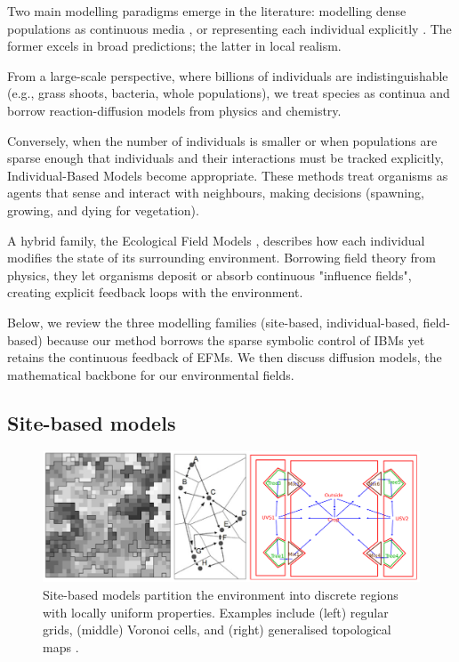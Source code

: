 
Two main modelling paradigms emerge in the literature: modelling dense populations as continuous media \cite{Turing1952}, or representing each individual explicitly \cite{Czaran1998}. The former excels in broad predictions; the latter in local realism.

From a large-scale perspective, where billions of individuals are indistinguishable (e.g., grass shoots, bacteria, whole populations), we treat species as continua and borrow reaction-diffusion models from physics and chemistry.

Conversely, when the number of individuals is smaller or when populations are sparse enough that individuals and their interactions must be tracked explicitly, Individual-Based Models become appropriate. These methods treat organisms as agents that sense and interact with neighbours, making decisions (spawning, growing, and dying for vegetation).

A hybrid family, the Ecological Field Models \cite{Wu1985}, describes how each individual modifies the state of its surrounding environment. Borrowing field theory from physics, they let organisms deposit or absorb continuous "influence fields", creating explicit feedback loops with the environment.

Below, we review the three modelling families (site-based, individual-based, field-based) because our method borrows the sparse symbolic control of IBMs yet retains the continuous feedback of EFMs. We then discuss diffusion models, the mathematical backbone for our environmental fields.

\subsection{Site-based models}

\begin{figure}
    \includegraphics[width=.8\linewidth]{grid-based-modeling-teaser.png}
    \caption{Site-based models partition the environment into discrete regions with locally uniform properties. Examples include (left) regular grids, (middle) Voronoi cells, and (right) generalised topological maps \cite{Nelson2012,Lemiere2023}.}
    \label{fig:env-obj-grid-based-models}
\end{figure}

